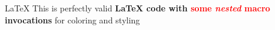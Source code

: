 \usepackage{xcolor}

\newcommand{\tcgreen}[1]{\textcolor{green}{#1}}
\renewcommand{\tcgreen}[1]{\textcolor{green}{#1}}

\newcommand{\tcred}[1]{\textcolor{red}{#1}}
\newcommand{\tcblue}[1]{\textcolor{blue}{#1}}


\begin{testenv}{\LaTeX}
This is perfectly valid \textbf{\LaTeX{} code with \tcred{some \textit{nested}
macro} invocations} for coloring and styling
\end{testenv}

\code

